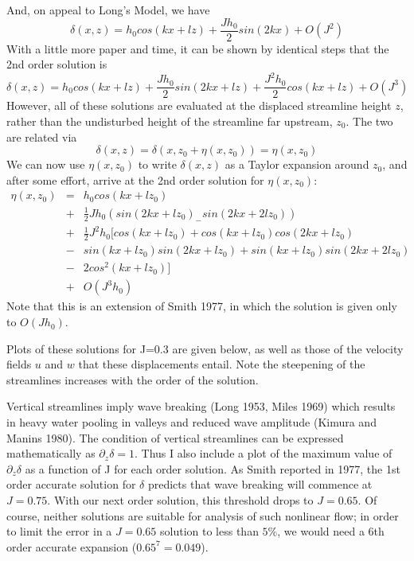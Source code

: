 \documentclass[12pt]{article}
\begin{document}
And, on appeal to Long's Model, we have 
\[
\delta(x,z) = h_0cos(kx+lz) + \frac{J h_0}{2}sin(2kx) + O(J^2)
\]
With a little more paper and time, it can be shown by identical steps that the 2nd order solution is  
\[
\delta(x,z) = h_0cos(kx+lz) + \frac{J h_0}{2}sin(2kx+lz) + \frac{J ^2h_0}{2}cos(kx+lz) + O(J^3)
\]
However, all of these solutions are evaluated at the displaced streamline height $z$, rather than the undisturbed height of the streamline far upstream, $z_0$. The two are related via
\[
\delta(x,z) = \delta(x,z_0+\eta(x,z_0)) = \eta(x,z_0)
\]
We can now use $\eta(x,z_0)$ to write $\delta(x,z)$ as a Taylor expansion around $z_0$, and after some effort, arrive at the 2nd order solution for $\eta(x,z_0)$:
\begin{eqnarray*}
\eta(x,z_0) &=& h_0cos(kx+lz_0)\\
 &+&\frac{1}{2}Jh_0(sin(2kx+lz_0)_ - sin(2kx + 2lz_0))\\
 &+&\frac{1}{2}J^2h_0[cos(kx+lz_0)+cos(kx+lz_0)cos(2kx+lz_0)\\
 &-&sin(kx+lz_0)sin(2kx+lz_0)+sin(kx+lz_0)sin(2kx+2lz_0)\\
 &-&2cos^2(kx+lz_0)]\\
 &+& O(J^3h_0)
\end{eqnarray*}
Note that this is an extension of Smith 1977, in which the solution is given only to $O(Jh_0)$. 

Plots of these solutions for J=0.3 are given below, as well as those of the velocity fields $u$ and $w$ that these displacements entail. Note the steepening of the streamlines increases with the order of the solution. 

Vertical streamlines imply wave breaking (Long 1953, Miles 1969) which results in heavy water pooling in valleys and reduced wave amplitude (Kimura and Manins 1980). The condition of vertical streamlines can be expressed mathematically as $\partial_z \delta = 1$. Thus I also include a plot of the maximum value of $\partial_z \delta$ as a function of J for each order solution. As Smith reported in 1977, the 1st order accurate solution for $\delta$ predicts that wave breaking will commence at $J=0.75$. With our next order solution, this threshold drops to $J=0.65$. Of course, neither solutions are suitable for analysis of such nonlinear flow; in order to limit the error in a $J=0.65$ solution to less than $5\%$, we would need a 6th order accurate expansion ($0.65^7 = 0.049$).
\end{document}

